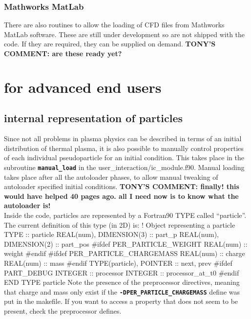 \documentclass[12pt,a4paper]{article}
\newcommand{\inlinecode}[1]{{\color{warwickred} \bf\texttt{#1}}}
\newcommand{\EPOCH}{{\color{warwickdark}\fontfamily{phv}\selectfont{EPOCH}}}
\newcommand{\tony}[1]{{\color{warwickred} \bf{TONY'S COMMENT:} \bf{#1}}\\}
\newenvironment{boxverbatim}{\lboxverbatim{none}}{\endlboxverbatim}
\begin{document}
\subsubsection{Mathworks MatLab}
There are also routines to allow the loading of CFD files from Mathworks
MatLab software. These are still under development so are not shipped with the
code. If they are required, they can be supplied on demand.
\tony{are these ready yet?}

\newpage
\section{{\EPOCH} for advanced end users}
\label{sec:advancedusers}

\subsection{{\EPOCH} internal representation of particles}
\label{partrep}
Since not all problems in plasma physics can be described in terms of an
initial distribution of thermal plasma, it is also possible to manually
control properties of each individual pseudoparticle for an initial
condition. This takes place in the subroutine \inlinecode{manual\_load} in the
user\_interaction/ic\_module.f90. Manual loading takes place after
all the autoloader phases, to allow manual tweaking of autoloader specified
initial conditions.   \tony{finally! this would have helped 40 pages ago. all
I need now is to know what the autoloader is!}

Inside the code, particles are represented by a Fortran90 TYPE called
``particle''. The current definition of this type (in 2D) is:
\begin{boxverbatim}
! Object representing a particle
  TYPE :: particle
    REAL(num), DIMENSION(3) :: part_p
    REAL(num), DIMENSION(2) :: part_pos
#ifdef PER_PARTICLE_WEIGHT
    REAL(num) :: weight
#endif
#ifdef PER_PARTICLE_CHARGEMASS
    REAL(num) :: charge
    REAL(num) :: mass
#endif
    TYPE(particle), POINTER :: next, prev
#ifdef PART_DEBUG
    INTEGER :: processor
    INTEGER :: processor_at_t0
#endif
  END TYPE particle
\end{boxverbatim}
Note the presence of the preprocessor directives, meaning that charge and mass
only exist if the \inlinecode{-DPER\_PARTICLE\_CHARGEMASS} define was put in
the makefile. If you want to access a property that does not seem to be
present, check the preprocessor defines.
\end{document}
